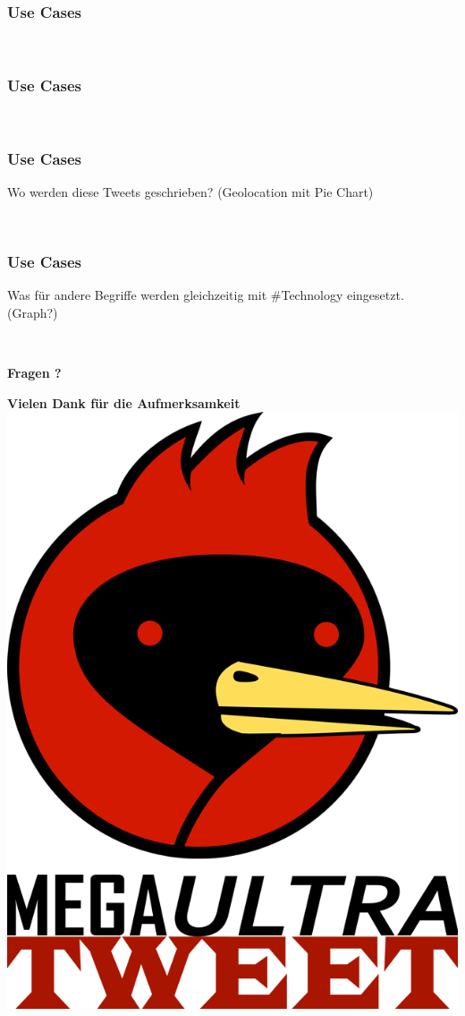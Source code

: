 \documentclass{beamer}
\begin{document}
\begin{frame}[fragile]
  \frametitle{Use Cases}

  \begin{lstlisting}
    
  \end{lstlisting}
\end{frame}

\begin{frame}[fragile]
  \frametitle{Use Cases}

  \begin{lstlisting}
    
  \end{lstlisting}
\end{frame}

\begin{frame}[fragile]
  \frametitle{Use Cases}
  Wo werden diese Tweets geschrieben? (Geolocation mit Pie Chart)
  \begin{lstlisting}
    
  \end{lstlisting}
\end{frame}

\begin{frame}[fragile]
  \frametitle{Use Cases}
  Was für andere Begriffe werden gleichzeitig mit \#Technology eingesetzt. (Graph?)
  \begin{lstlisting}
    
  \end{lstlisting}
\end{frame}

\begin{frame}
  \begin{center}
      \textbf{Fragen ?}
  \end{center}
\end{frame}

\begin{frame}
  \begin{center}
      \textbf{Vielen Dank für die Aufmerksamkeit} \\
      \includegraphics[width=.4\textwidth]{megaultra_ruby}
  \end{center}
\end{frame}
\end{document}
